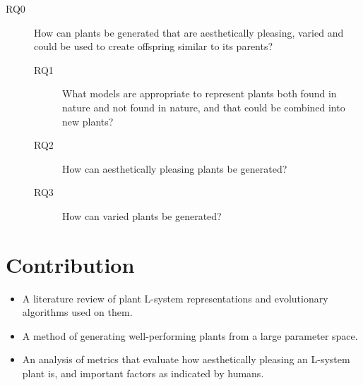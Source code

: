 \begin{description}
    \item[RQ0] How can plants be generated that are aesthetically pleasing, varied and could be used to create offspring similar to its parents?
    \begin{description}
        \item[RQ1] What models are appropriate to represent plants both found in nature and not found in nature, and that could be combined into new plants?
        \item[RQ2] How can aesthetically pleasing plants be generated?
        \item[RQ3] How can varied plants be generated?
    \end{description}
\end{description}

\section{Contribution}
\begin{itemize}
    \item A literature review of plant \gls{L-system} representations and evolutionary algorithms used on them.
    \item A method of generating well-performing plants from a large parameter space.
    \item An analysis of metrics that evaluate how aesthetically pleasing an \gls{L-system} plant is, and important factors as indicated by humans.
\end{itemize}
